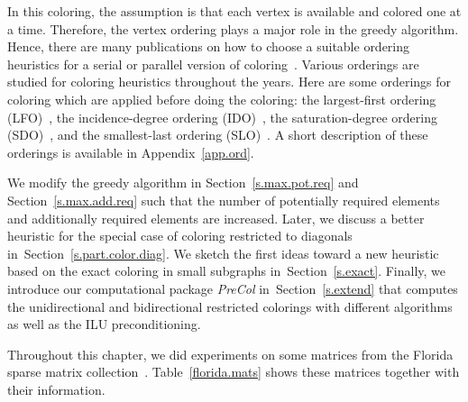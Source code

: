 \documentclass[12pt, twoside,a4paper,toc=bibliography]{scrbook}
\newcommand{\secref}[1]{Section~\protect\ref{#1}}
\newcommand{\appref}[1]{Appendix~\protect\ref{#1}}
\begin{document}
In this coloring, the assumption is that each vertex is available and colored one at a time.
Therefore, the vertex ordering plays a major role in the greedy algorithm.
Hence, there are many publications on how to choose
a suitable ordering heuristics for a serial or parallel version of
coloring~\cite{ordering1,ordering2,ordering3}.
Various orderings are studied for coloring heuristics
throughout the years. Here are some orderings for coloring which are applied before doing the coloring:
the largest-first ordering (LFO)~\cite{LFO}, the incidence-degree ordering (IDO)~\cite{IDO},
the saturation-degree ordering (SDO)~\cite{SDO}, and the smallest-last ordering (SLO)~\cite{ordering1}.
A short description of these orderings is available in \appref{app.ord}.

We modify the greedy algorithm in \secref{s.max.pot.req} and \secref{s.max.add.req}
 such that the number of potentially required elements
and additionally required elements are increased.
Later, we discuss a better heuristic for
the special case of coloring restricted to diagonals in~\secref{s.part.color.diag}.
We sketch the first ideas toward a new heuristic based on the exact coloring in small
subgraphs in~\secref{s.exact}.
Finally, we introduce our computational package \textit{PreCol} 
in~\secref{s.extend} that computes the 
unidirectional and bidirectional restricted colorings with different algorithms
as well as the ILU preconditioning. 

Throughout this chapter, we did experiments on some matrices from the Florida sparse
matrix collection~\cite{florida.matrices}. Table~\ref{florida.mats} shows these matrices
together with their information.
\end{document}
